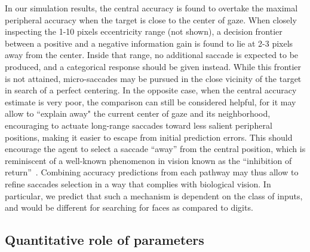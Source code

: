 In our simulation results, the central accuracy is found to overtake the maximal peripheral accuracy when the target is close to the center of gaze. When closely inspecting the 1-10 pixels eccentricity range (not shown), a decision frontier between a positive and a negative information gain is found to lie at 2-3 pixels away from the center. Inside that range, no additional saccade is expected to be produced, and a categorical response should be given instead.  %
While this frontier is not attained, micro-saccades may be pursued in the close vicinity of the target in search of a perfect centering. 
In the opposite case, when the central accuracy estimate is very poor, the comparison can still be considered helpful, for it may allow to ``explain away" the current center of gaze and its neighborhood, encouraging to actuate long-range saccades toward less salient peripheral positions, making it easier to escape from initial prediction errors. 
This should encourage the agent to select a saccade ``away'' from the central position, which is reminiscent of a well-known phenomenon in vision known as the ``inhibition of return''~\cite{Itti01}. Combining accuracy predictions from each pathway may thus allow to refine saccades selection in a way that complies with biological vision.
In particular, we predict that such a mechanism is dependent on the class of inputs, and would be different for searching for faces as compared to digits. 
\\

\subsection*{Quantitative role of parameters}


